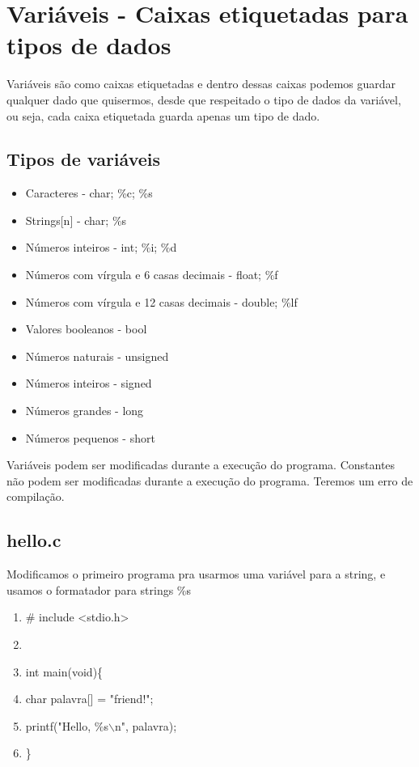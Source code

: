 \documentclass[12pt,a4paper]{article} %
\begin{document}
\section{Variáveis - Caixas etiquetadas para tipos de dados}
\tabto{2cm}Variáveis são como caixas etiquetadas e dentro dessas caixas podemos guardar qualquer dado que quisermos, desde que respeitado o tipo de dados da variável, ou seja, cada caixa etiquetada guarda apenas um tipo de dado.

\subsection{Tipos de variáveis}
\begin{itemize}
\item Caracteres - char; \%c; \%s
\item Strings[n] - char; \%s
\item Números inteiros - int; \%i; \%d
\item Números com vírgula e 6 casas decimais - float; \%f
\item Números com vírgula e 12 casas decimais - double; \%lf
\item Valores booleanos - bool
\item Números naturais - unsigned
\item Números inteiros - signed
\item Números grandes - long
\item Números pequenos - short
\end{itemize}

\tabto{2cm}Variáveis podem ser modificadas durante a execução do programa.
\tabto{2cm}Constantes não podem ser modificadas durante a execução do programa. Teremos um erro de compilação.

\subsection{hello.c}
\tabto{2cm}Modificamos o primeiro programa pra usarmos uma variável para a string, e usamos o formatador para strings \%s
\begin{enumerate}
\item \# include <stdio.h>
\item 
\item int main(void)\{
\item \tabto{1.1cm} char palavra[] = "friend!";
\item \tabto{1.1cm} printf("Hello, \%s$\backslash$n", palavra);
\item \}
\end{enumerate}
\end{document}
